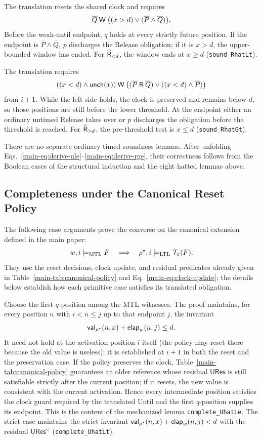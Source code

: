 The translation resets the shared clock and requires
\[
  \overline{Q}\mathbin{\mathsf{W}}\bigl((x>d)\lor(\overline{P}\land \overline{Q})\bigr).
\]
Before the weak-until endpoint, $q$ holds at every strictly future position.
If the endpoint is $\overline{P}\land \overline{Q}$, $p$ discharges the Release obligation; if it is
$x>d$, the upper-bounded window has ended.  For $\mathbin{\widehat{\mathsf{R}}}_{<d}$, the window
ends at $x\ge d$ (\texttt{sound\_\allowbreak{}RhatLt}).

The translation requires
\[
  ((x<d)\land\mathsf{unch}(x))
  \mathbin{\mathsf{W}}
  \bigl((\overline{P}\mathbin{\mathsf{R}} \overline{Q})\lor((x<d)\land \overline{P})\bigr)
\]
from $i+1$.  While the left side holds, the clock is preserved and remains
below $d$, so those positions are still before the lower threshold.  At the
endpoint either an ordinary untimed Release takes over or $p$ discharges the
obligation before the threshold is reached.  For $\mathbin{\widehat{\mathsf{R}}}_{>d}$, the
pre-threshold test is $x\le d$ (\texttt{sound\_\allowbreak{}RhatGt}).

There are no separate ordinary timed soundness lemmas.  After unfolding
Eqs.~\eqref{main-eq:derive-ule}--\eqref{main-eq:derive-rge}, their
correctness follows from the Boolean cases of the structural induction and the
eight hatted lemmas above.

\subsection{Completeness under the Canonical Reset Policy}
\label{subsec:timed-completeness}

The following case arguments prove the converse on the canonical extension
defined in the main paper:
\[
  w,i\models_{\mathrm{MTL}} F
  \quad\Longrightarrow\quad
  \rho^\star,i\models_{\mathrm{LTL}}\mathcal{T}_\pi(F).
\]
They use the reset decisions, clock update, and residual predicates already
given in Table~\ref{main-tab:canonical-policy} and
Eq.~\ref{main-eq:clock-update}; the details below establish how each primitive
case satisfies its translated obligation.

Choose the first $q$-position among the MTL witnesses.  The proof maintains,
for every position $n$ with $i<n\le j$ up to that endpoint $j$, the invariant
\[
  \mathsf{val}_{\rho^\star}(n,x)+\mathsf{elap}_w(n,j)\le d.
\]
It need not hold at the activation position $i$ itself (the policy may reset
there because the old value is useless); it is established at $i+1$ in both
the reset and the preservation case.
If the policy preserves the clock, Table~\ref{main-tab:canonical-policy}
guarantees an older reference whose residual $\mathsf{URes}$ is still
satisfiable strictly after the current position; if it resets, the new value is
consistent with the current activation.  Hence every intermediate position satisfies the clock
guard required by the translated Until and the first $q$-position supplies its
endpoint.  This is the content of the mechanized lemma
\texttt{complete\_\allowbreak{}UhatLe}.  The strict case maintains the strict
invariant $\mathsf{val}_{\rho^\star}(n,x)+\mathsf{elap}_w(n,j)<d$ with the residual
$\mathsf{URes}^{<}$ (\texttt{complete\_\allowbreak{}UhatLt}).

